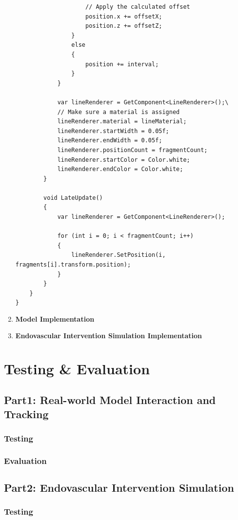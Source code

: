 \documentclass[12pt]{article}
\begin{document}
\begin{enumerate}
\begin{verbatim}
                    // Apply the calculated offset
                    position.x += offsetX;
                    position.z += offsetZ;
                }
                else
                {
                    position += interval;
                }
            }

            var lineRenderer = GetComponent<LineRenderer>();\
            // Make sure a material is assigned
            lineRenderer.material = lineMaterial; 
            lineRenderer.startWidth = 0.05f;
            lineRenderer.endWidth = 0.05f;
            lineRenderer.positionCount = fragmentCount;
            lineRenderer.startColor = Color.white;
            lineRenderer.endColor = Color.white;
        }

        void LateUpdate()
        {
            var lineRenderer = GetComponent<LineRenderer>();

            for (int i = 0; i < fragmentCount; i++)
            {
                lineRenderer.SetPosition(i, fragments[i].transform.position);
            }
        }
    }
}
      \end{verbatim}
      \item \textbf{Model Implementation}
      \item \textbf{Endovascular Intervention Simulation Implementation}
\end{enumerate}


\section{Testing \& Evaluation}
\subsection{Part1: Real-world Model Interaction and Tracking}
\subsubsection{Testing}
\subsubsection{Evaluation}
\subsection{Part2: Endovascular Intervention Simulation}
\subsubsection{Testing}
\end{document}
